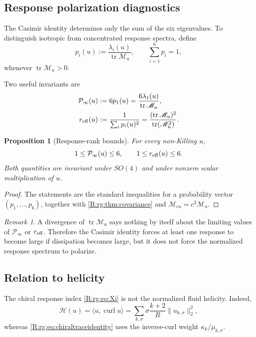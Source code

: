 \documentclass[
 aps,
 prd,
 reprint,
 amsmath,
 amssymb,
 nofootinbib,
 superscriptaddress
]{revtex4-2}
\newtheorem{proposition}[theorem]{Proposition}
\theoremstyle{definition}
\theoremstyle{remark}
\newtheorem{remark}[theorem]{Remark}
\newcommand{\cM}{\mathscr M}
\newcommand{\curl}{\operatorname{curl}}
\newcommand{\tr}{\operatorname{tr}}
\begin{document}
\subsection{Response polarization diagnostics}

The Casimir identity determines only the sum of the six eigenvalues.
To distinguish isotropic from concentrated response spectra, define
\begin{equation}
 p_i(u)
 :=
 \frac{\lambda_i(u)}{\tr\cM_u},
 \qquad
 \sum_{i=1}^6p_i=1,
 \label{R:rg:eq:pi}
\end{equation}
whenever $\tr\cM_u>0$.

Two useful invariants are
\begin{align}
 \mathcal P_\infty(u)
 &:=
 6p_1(u)
 =
 \frac{6\lambda_1(u)}{\tr\cM_u},
 \label{R:rg:eq:Pinfty}\\
 r_{\rm eff}(u)
 &:=
 \frac{1}{\sum_i p_i(u)^2}
 =
 \frac{(\tr\cM_u)^2}{\tr(\cM_u^2)}.
 \label{R:rg:eq:reff}
\end{align}

\begin{proposition}[Response-rank bounds]
\label{R:rg:prop:responsebounds}
For every non-Killing $u$,
\begin{equation}
 1\le\mathcal P_\infty(u)\le6,
 \qquad
 1\le r_{\rm eff}(u)\le6.
 \label{R:rg:eq:responsebounds}
\end{equation}
Both quantities are invariant under $SO(4)$ and under nonzero scalar
multiplication of $u$.
\end{proposition}

\begin{proof}
The statements are the standard inequalities for a probability vector
$(p_1,\ldots,p_6)$, together with
\cref{R:rg:thm:covariance} and $\cM_{cu}=c^2\cM_u$.
\end{proof}

\begin{remark}
A divergence of $\tr\cM_u$ says nothing by itself about the limiting values
of $\mathcal P_\infty$ or $r_{\rm eff}$.  Therefore the Casimir identity
forces at least one response to become large if dissipation becomes large,
but it does not force the normalized response spectrum to polarize.
\end{remark}

\subsection{Relation to helicity}

The chiral response index \eqref{R:rg:eq:Xi} is not the normalized fluid helicity.
Indeed,
\begin{equation}
 \mathscr H(u)
 =
 \langle u,\curl u\rangle
 =
 \sum_{k,\sigma}
 \sigma\frac{k+2}{R}
 \|u_{k,\sigma}\|_2^2,
 \label{R:rg:eq:helicity}
\end{equation}
whereas \eqref{R:rg:eq:chiraltraceidentity} uses the inverse-curl weight
$\kappa_k/\mu_{k,\sigma}$.
\end{document}
